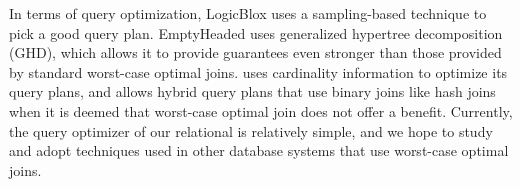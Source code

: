 In terms of query optimization,
 LogicBlox uses a sampling-based technique to pick a good query plan.
EmptyHeaded uses generalized hypertree decomposition (GHD),
 which allows it to provide guarantees even stronger than 
 those provided by standard worst-case optimal joins.
\citep{umbra-wcoj} uses cardinality information to optimize its query plans,
 and allows hybrid query plans that use binary joins like hash joins
 when it is deemed that worst-case optimal join does not offer a benefit.
Currently, the query optimizer of our relational \egraph is relatively simple,
 and we hope to study and adopt techniques used in other database systems 
 that use worst-case optimal joins.
